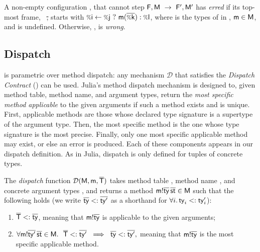\begin{definition}[Errors] A non-empty configuration \frm, \mtbl
 that cannot step $\mathsf{F}, \mathsf{M} ~\rightarrow~ \mathsf{F}', \mathsf{M}'$ has \emph{erred} if its
 top-most frame, \E\ \ol\st, starts with $\cond\i\j{\call\m{\ol{\v\k}}}{\v\l}$,
 where \ol\Ty is the types of \ol{\v\k} in \E, $\mathsf{m}\in\mathsf{M}$, and
 \dispatch\mtbl\m{\ol\Ty} is undefined. Otherwise, \frm, \mtbl is
 \emph{wrong}.
\end{definition}

\subsection{Dispatch}\label{sec:disp}

\jules is parametric over method dispatch: any mechanism $\mathcal D$ that
satisfies the \emph{Dispatch Contract} () can be used. Julia's
method dispatch mechanism
is designed to, given method table, method name, and argument types,
return the \emph{most specific method applicable} to the given arguments
if such a method exists and is unique. First, applicable
methods are those whose declared type signature is a supertype of the argument
type. Then, the most specific method is the one whose type signature is the
most precise. Finally, only one most specific applicable method may exist, or
else an error is produced. Each of these components appears in our dispatch
definition. As in Julia, dispatch is only defined for tuples of concrete types.

\begin{definition} The \emph{dispatch} function
  $\operatorname{{\mathcal D}}(\mathsf{M},\mathsf{\mathsf{m}},{\overline{\mathsf{T}}})$ takes method table \mtbl, method name \m,
  and concrete argument types \ol\Ty, and returns a method
  $\mathsf{m}!{\overline{\mathsf{ty}}}\,\overline{\mathsf{st}} \in \mathsf{M}$ such that
  the following holds (we write $\overline{\mathsf{ty}} <: \overline{\mathsf{ty}'}$ as a shorthand for
  $\forall i.\,\mathsf{ty}_i<:\mathsf{ty}'_i$):
  \begin{enumerate}
    \item $\overline{\mathsf{T}} <: \overline{\mathsf{ty}}$, meaning that $\mathsf{m}!{\overline{\mathsf{ty}}}$
      is applicable to the given arguments;
    \item $\forall \mathsf{m}!{\overline{\mathsf{ty}'}}\,\overline{\mathsf{st}} \in \mathsf{M}.\ \
      \overline{\mathsf{T}} <: \overline{\mathsf{ty}'}\ \implies\ \overline{\mathsf{ty}} <: \overline{\mathsf{ty}'},$
      meaning that $\mathsf{m}!{\overline{\mathsf{ty}}}$ is the most specific applicable method.
  \end{enumerate}
  \label{disprel}
\end{definition}

